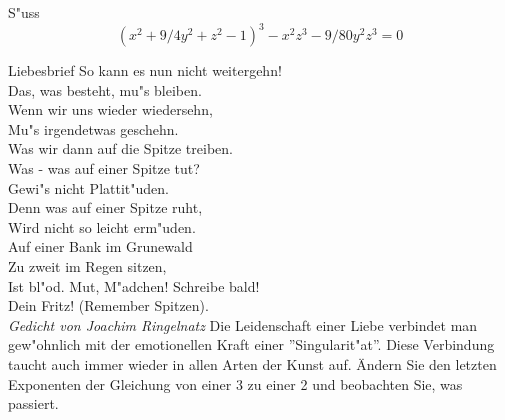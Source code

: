 \begin{surferPage}{S"uss}
\[(x^2+ 9/4y^2	+ z^2- 1)^3- x^2z^3	- 9/80y^2z^3	= 0\]

\singlespacing
Liebesbrief
\singlespacing
So kann es nun nicht weitergehn! \\
Das, was besteht, mu"s bleiben. \\
Wenn wir uns wieder wiedersehn, \\
Mu"s irgendetwas geschehn. \\
Was wir dann auf die Spitze treiben.\\ 
Was - was auf einer Spitze tut? \\
Gewi"s nicht Plattit"uden. \\
Denn was auf einer Spitze ruht, \\
Wird nicht so leicht erm"uden. \\
Auf einer Bank im Grunewald \\
Zu zweit im Regen sitzen, \\
Ist bl"od. Mut, M"adchen! Schreibe bald! \\
Dein Fritz! (Remember Spitzen). \\
 {\it Gedicht von Joachim Ringelnatz}
\singlespacing 
Die Leidenschaft einer Liebe verbindet man gew"ohnlich mit der emotionellen Kraft einer ''Singularit"at''. Diese Verbindung taucht auch immer wieder in allen Arten der Kunst auf.
\singlespacing 
\"Andern Sie den letzten Exponenten der Gleichung von einer 3 zu einer 2 und beobachten Sie, was passiert.
\end{surferPage}
